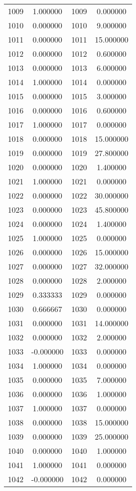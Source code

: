 \documentclass[12pt]{article}
\begin{document}
\begin{longtable}{@{}cccc@{}}
1009 & 1.000000 & 1009 & 0.000000 \\
1010 & 0.000000 & 1010 & 9.000000 \\
1011 & 0.000000 & 1011 & 15.000000 \\
1012 & 0.000000 & 1012 & 0.600000 \\
1013 & 0.000000 & 1013 & 6.000000 \\
1014 & 1.000000 & 1014 & 0.000000 \\
1015 & 0.000000 & 1015 & 3.000000 \\
1016 & 0.000000 & 1016 & 0.600000 \\
1017 & 1.000000 & 1017 & 0.000000 \\
1018 & 0.000000 & 1018 & 15.000000 \\
1019 & 0.000000 & 1019 & 27.800000 \\
1020 & 0.000000 & 1020 & 1.400000 \\
1021 & 1.000000 & 1021 & 0.000000 \\
1022 & 0.000000 & 1022 & 30.000000 \\
1023 & 0.000000 & 1023 & 45.800000 \\
1024 & 0.000000 & 1024 & 1.400000 \\
1025 & 1.000000 & 1025 & 0.000000 \\
1026 & 0.000000 & 1026 & 15.000000 \\
1027 & 0.000000 & 1027 & 32.000000 \\
1028 & 0.000000 & 1028 & 2.000000 \\
1029 & 0.333333 & 1029 & 0.000000 \\
1030 & 0.666667 & 1030 & 0.000000 \\
1031 & 0.000000 & 1031 & 14.000000 \\
1032 & 0.000000 & 1032 & 2.000000 \\
1033 & -0.000000 & 1033 & 0.000000 \\
1034 & 1.000000 & 1034 & 0.000000 \\
1035 & 0.000000 & 1035 & 7.000000 \\
1036 & 0.000000 & 1036 & 1.000000 \\
1037 & 1.000000 & 1037 & 0.000000 \\
1038 & 0.000000 & 1038 & 15.000000 \\
1039 & 0.000000 & 1039 & 25.000000 \\
1040 & 0.000000 & 1040 & 1.000000 \\
1041 & 1.000000 & 1041 & 0.000000 \\
1042 & -0.000000 & 1042 & 0.000000 \\

\end{longtable}
\end{document}
